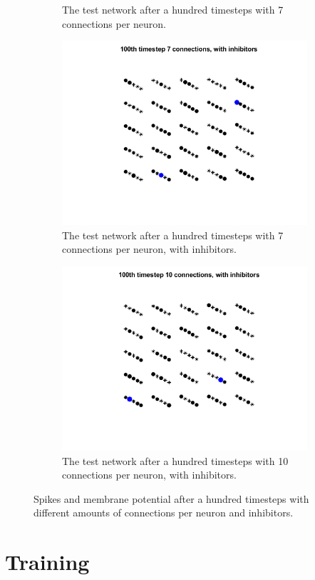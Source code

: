 \begin{figure}
\begin{subfigure}[b]{0.4\textwidth}
        \caption{The test network after a hundred timesteps with 7 connections per neuron.}
    \label{fig:reservoir_7}
    \end{subfigure}
    \begin{subfigure}[b]{0.4\textwidth}
        \includegraphics[width=\textwidth]{Images/pool_7_100_s.png}
        \caption{The test network after a hundred timesteps with 7 connections per neuron, with inhibitors.}
    \label{fig:reservoir_7_in}
    \end{subfigure}
     \begin{subfigure}[b]{0.4\textwidth}
        \includegraphics[width=\textwidth]{Images/pool_10_100_s.png}
        \caption{The test network after a hundred timesteps with 10 connections per neuron, with inhibitors.}
    \label{fig:reservoir_10_in}
    \end{subfigure}
    \caption{Spikes and membrane potential after a hundred timesteps with different amounts of connections per neuron and inhibitors.}
\end{figure}

\section{Training}














